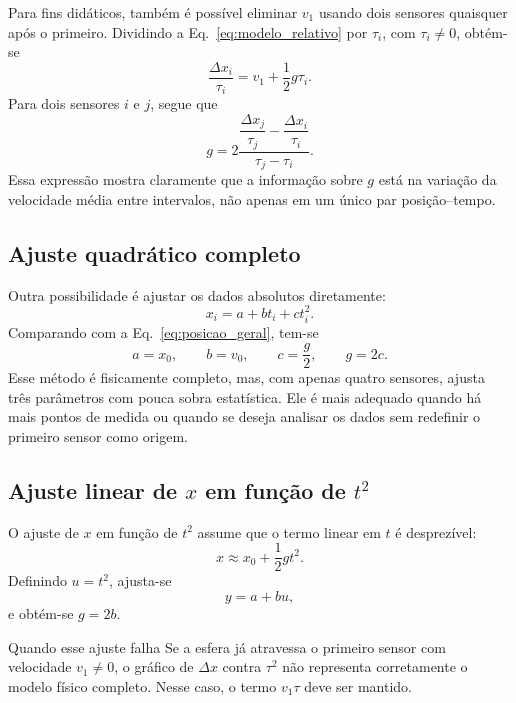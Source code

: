 \documentclass[11pt,a4paper]{article}
\begin{document}
Para fins didáticos, também é possível eliminar $v_1$ usando dois sensores quaisquer após o primeiro. Dividindo a Eq.~\eqref{eq:modelo_relativo} por $\tau_i$, com $\tau_i\neq0$, obtém-se
\begin{equation}
  \frac{\Delta x_i}{\tau_i}=v_1+\frac{1}{2}g\tau_i.
\end{equation}
Para dois sensores $i$ e $j$, segue que
\begin{equation}
  g=2\frac{\dfrac{\Delta x_j}{\tau_j}-\dfrac{\Delta x_i}{\tau_i}}{\tau_j-\tau_i}.
  \label{eq:g_dois_sensores}
\end{equation}
Essa expressão mostra claramente que a informação sobre $g$ está na variação da velocidade média entre intervalos, não apenas em um único par posição--tempo.

\subsection{Ajuste quadrático completo}

Outra possibilidade é ajustar os dados absolutos diretamente:
\begin{equation}
  x_i=a+bt_i+ct_i^2.
  \label{eq:ajuste_quadratico}
\end{equation}
Comparando com a Eq.~\eqref{eq:posicao_geral}, tem-se
\begin{equation}
  a=x_0,
  \qquad b=v_0,
  \qquad c=\frac{g}{2},
  \qquad g=2c.
\end{equation}
Esse método é fisicamente completo, mas, com apenas quatro sensores, ajusta três parâmetros com pouca sobra estatística. Ele é mais adequado quando há mais pontos de medida ou quando se deseja analisar os dados sem redefinir o primeiro sensor como origem.

\subsection{Ajuste linear de $x$ em função de $t^2$}

O ajuste de $x$ em função de $t^2$ assume que o termo linear em $t$ é desprezível:
\begin{equation}
  x\approx x_0+\frac{1}{2}gt^2.
\end{equation}
Definindo $u=t^2$, ajusta-se
\begin{equation}
  y=a+bu,
\end{equation}
e obtém-se $g=2b$.

\begin{caixaCuidado}{Quando esse ajuste falha}
Se a esfera já atravessa o primeiro sensor com velocidade $v_1\neq0$, o gráfico de $\Delta x$ contra $\tau^2$ não representa corretamente o modelo físico completo. Nesse caso, o termo $v_1\tau$ deve ser mantido.
\end{caixaCuidado}
\end{document}
